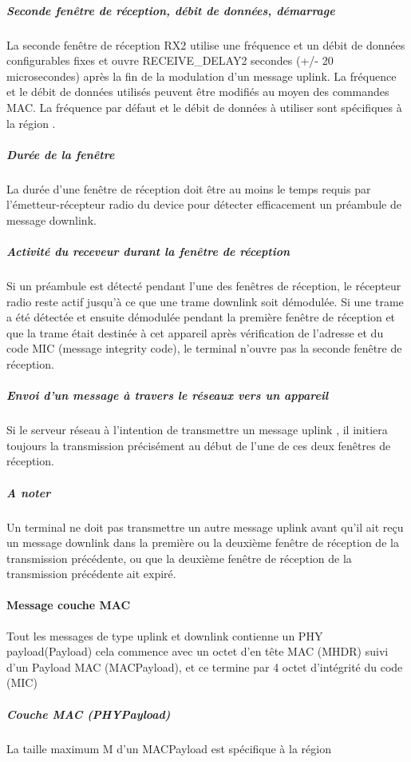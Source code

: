 \documentclass[11pt]{article}
\begin{document}
\subparagraph{Seconde fenêtre de réception, débit de données, démarrage}
La seconde fenêtre de réception RX2 utilise une fréquence et un débit de données configurables fixes et ouvre RECEIVE\_DELAY2 secondes (+/- 20 microsecondes) après la fin de la modulation d'un message uplink. La fréquence et le débit de données utilisés peuvent être modifiés au moyen des commandes MAC. La fréquence par défaut et le débit de données à utiliser sont spécifiques à la région .

\subparagraph{Durée de la fenêtre}

La durée d'une fenêtre de réception doit être au moins le temps requis par l'émetteur-récepteur radio du device pour détecter efficacement un préambule de message downlink.

\subparagraph{Activité du receveur durant la fenêtre de réception}

Si un préambule est détecté pendant l'une des fenêtres de réception, le récepteur radio reste actif jusqu'à ce que une trame downlink soit démodulée. Si une trame a été détectée et ensuite démodulée pendant la première fenêtre de réception et que la trame était destinée à cet appareil après vérification de l'adresse et du code MIC (message integrity code), le terminal n'ouvre pas la seconde fenêtre de réception.

\subparagraph{Envoi d'un message à travers le réseaux vers un appareil}

Si le serveur réseau à l'intention de transmettre un message uplink , il initiera toujours la transmission précisément au début de l'une de ces deux fenêtres de réception.
\subparagraph{A noter}

Un terminal ne doit pas transmettre un autre message uplink avant qu'il ait reçu un message downlink dans la première ou la deuxième fenêtre de réception de la transmission précédente, ou que la deuxième fenêtre de réception de la transmission précédente ait expiré.

\paragraph{Message couche MAC }
Tout les messages de type uplink et downlink contienne un PHY payload(Payload) cela commence avec un octet d'en tête MAC (MHDR) suivi d'un Payload MAC (MACPayload), et ce termine par 4 octet d'intégrité du code (MIC)

\subparagraph{Couche MAC (PHYPayload)}
La taille maximum M d'un MACPayload est spécifique à la région 
\end{document}
